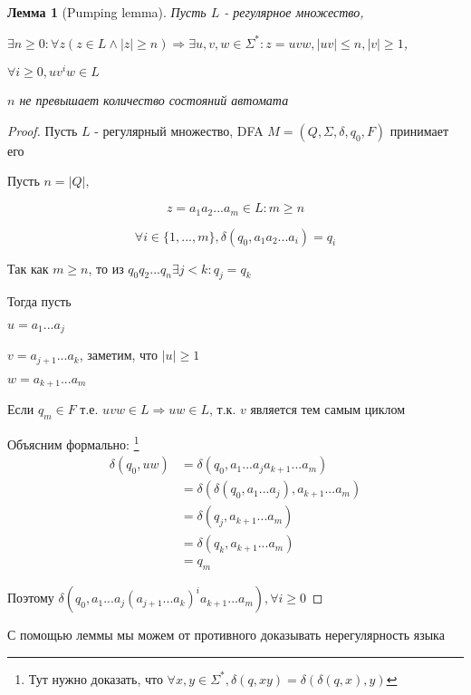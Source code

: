 \documentclass[5pt]{article}
\newtheorem{lemma}{Лемма}
\begin{document}
\begin{lemma}[Pumping lemma]
  Пусть $L$ - регулярное множество,

  $\exists n \geq 0 : \forall z (z \in L \land |z| \geq n) 

\Rightarrow
  \exists u,v,w \in \Sigma^* : z = uvw, |uv| \leq n, |v| \geq 1$,

  $\forall i \geq 0, uv^iw \in L$


  $n$ не превышает количество состояний автомата
\end{lemma}
\begin{proof}
  Пусть $L$ - регулярный множество, DFA $M = (Q, \Sigma, \delta ,q_0, F)$ принимает его 

  Пусть $n = |Q|,$

  $$z = a_1a_2...a_m \in L :  m \geq n$$

  $$\forall i \in \{1, ..., m\}, \delta(q_0, a_1a_2...a_i) = q_i$$

  Так как $m \geq n$, то из $q_0q_2...q_n \exists j < k : q_j = q_k$

  Тогда пусть

  $u = a_1...a_j$

  $v = a_{j+1}...a_k$, заметим, что $|u| \geq 1$

  $w = a_{k+1}...a_m$

  Если $q_m \in F$ т.е. $uvw \in L \Rightarrow uw \in L$, т.к. $v$ является тем самым циклом

  Объясним формально: \footnote{Тут нужно доказать, что $\forall x, y \in \Sigma^*, \delta(q, xy) = \delta(\delta(q, x), y)$}
  \[
    \begin{split}
      \delta(q_0, uw) & = \delta(q_0, a_1...a_ja_{k+1}...a_m) \\
      & = \delta(\delta(q_0, a_1...a_j),a_{k+1}...a_m) \\
      & = \delta(q_j,a_{k+1}...a_m) \\
      & = \delta(q_k,a_{k+1}...a_m) \\
      & = q_m
    \end{split}
  \]

  Поэтому 
  $\delta(q_0, a_1...a_j(a_{j+1}...a_k)^ia_{k+1}...a_m),  \forall i \geq 0$

\end{proof}

С помощью леммы мы можем от противного доказывать нерегулярность языка
\end{document}
